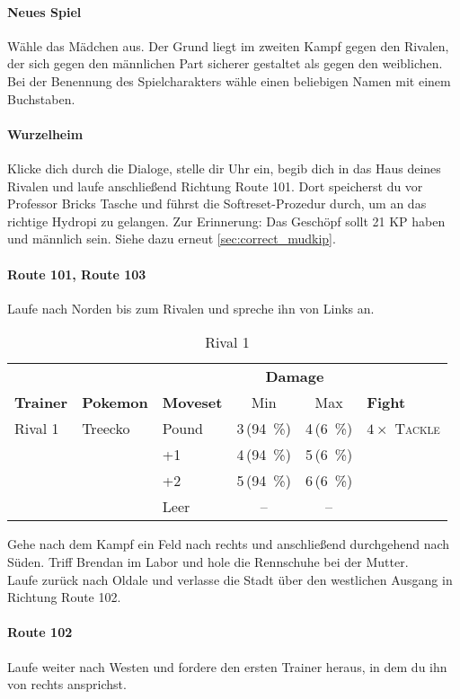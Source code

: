 \documentclass[11pt,a4paper,titlepage]{article}
\begin{document}
\paragraph{Neues Spiel}
Wähle das Mädchen aus. Der Grund liegt im zweiten Kampf gegen den Rivalen, der sich gegen den männlichen Part sicherer gestaltet als gegen den weiblichen. Bei der Benennung des Spielcharakters wähle einen beliebigen Namen mit einem Buchstaben.
\paragraph{Wurzelheim}
Klicke dich durch die Dialoge, stelle dir Uhr ein, begib dich in das Haus deines Rivalen und laufe anschließend Richtung Route 101. Dort speicherst du vor Professor Bricks Tasche und führst die Softreset-Prozedur durch, um an das richtige Hydropi zu gelangen. Zur Erinnerung: Das Geschöpf sollt 21 KP haben und  männlich sein. Siehe dazu erneut \ref{sec:correct_mudkip}.
\paragraph{Route 101, Route 103}
Laufe nach Norden bis zum Rivalen und spreche ihn von Links an.
\begin{table}[htbp]
	\caption{Rival 1}
	\centering
	\begin{tabular}{lllccl}
		\toprule 
		&&&\multicolumn{2}{c}{\textbf{Damage}}\\
		\cmidrule(rl){4-5}
		\textbf{Trainer}&\textbf{Pokemon}&\textbf{Moveset}&Min&Max&\textbf{Fight}\\ 
		\midrule
		Rival 1&Treecko&Pound&3\,(\SI{94}{\percent})&4\,(\SI{6}{\percent})&$4 \times$ \textsc{Tackle}\\
		&&+1&4\,(\SI{94}{\percent})&5\,(\SI{6}{\percent})\\
		&&+2&5\,(\SI{94}{\percent})&6\,(\SI{6}{\percent})\\
		&&Leer&--&--\\ 
		\bottomrule
	\end{tabular}
\end{table}
Gehe nach dem Kampf ein Feld nach rechts und anschließend durchgehend nach Süden. Triff Brendan im Labor und hole die Rennschuhe bei der Mutter.\\
Laufe zurück nach Oldale und verlasse die Stadt über den westlichen Ausgang in Richtung Route 102.

\paragraph{Route 102}
Laufe weiter nach Westen und fordere den ersten Trainer heraus, in dem du ihn von rechts ansprichst.
\end{document}

